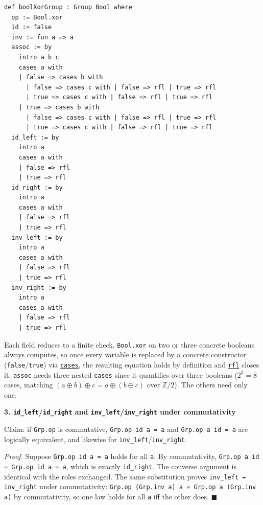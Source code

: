 \begin{lstlisting}
def boolXorGroup : Group Bool where
  op := Bool.xor
  id := false
  inv := fun a => a
  assoc := by
    intro a b c
    cases a with
    | false => cases b with
      | false => cases c with | false => rfl | true => rfl
      | true => cases c with | false => rfl | true => rfl
    | true => cases b with
      | false => cases c with | false => rfl | true => rfl
      | true => cases c with | false => rfl | true => rfl
  id_left := by
    intro a
    cases a with
    | false => rfl
    | true => rfl
  id_right := by
    intro a
    cases a with
    | false => rfl
    | true => rfl
  inv_left := by
    intro a
    cases a with
    | false => rfl
    | true => rfl
  inv_right := by
    intro a
    cases a with
    | false => rfl
    | true => rfl
\end{lstlisting}

Each field reduces to a finite check. \texttt{Bool.xor} on two or three concrete booleans always computes, so once every variable is replaced by a concrete constructor (\texttt{false}/\texttt{true}) via \href{https://lean-lang.org/doc/reference/latest/Tactic-Proofs/Tactic-Reference/}{\texttt{cases}}, the resulting equation holds by definition and \href{https://lean-lang.org/doc/reference/latest/Tactic-Proofs/Tactic-Reference/}{\texttt{rfl}} closes it. \texttt{assoc} needs three nested \texttt{cases} since it quantifies over three booleans (\(2^3 = 8\) cases, matching \((a \oplus b) \oplus c = a \oplus (b \oplus c)\) over \(\mathbb{Z}/2\)). The others need only one.

\textbf{3. \texttt{id\_\allowbreak{}left}/\texttt{id\_\allowbreak{}right} and \texttt{inv\_\allowbreak{}left}/\texttt{inv\_\allowbreak{}right} under commutativity}

Claim: if \texttt{Grp.op} is commutative, \texttt{Grp.op id a = a} and \texttt{Grp.op a id = a} are logically equivalent, and likewise for \texttt{inv\_\allowbreak{}left}/\texttt{inv\_\allowbreak{}right}.

\emph{Proof.} Suppose \texttt{Grp.op id a = a} holds for all \texttt{a}. By commutativity, \texttt{Grp.op a id = Grp.op id a = a}, which is exactly \texttt{id\_\allowbreak{}right}. The converse argument is identical with the roles exchanged. The same substitution proves \texttt{inv\_\allowbreak{}left ↔ inv\_\allowbreak{}right} under commutativity: \texttt{Grp.op (Grp.inv a) a = Grp.op a (Grp.inv a)} by commutativity, so one law holds for all \texttt{a} iff the other does. \(\blacksquare\)

